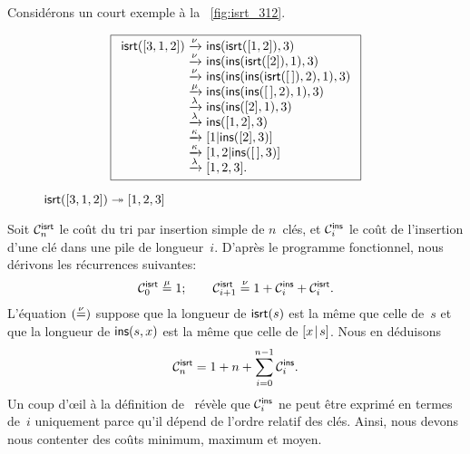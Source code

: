 Considérons un court exemple à la \fig~\vref{fig:isrt_312}.
\begin{figure}
\begin{equation*}
\boxed{%
\begin{array}{r@{\;}l@{\;}l}
\fun{isrt}([3,1,2])
& \xrightarrow{\smash{\nu}} & \fun{ins}(\fun{isrt}([1,2]),3)\\
& \xrightarrow{\smash{\nu}}
& \fun{ins}(\fun{ins}(\fun{isrt}([2]),1),3)\\
& \xrightarrow{\smash{\nu}}
& \fun{ins}(\fun{ins}(\fun{ins}(\fun{isrt}(\el),2),1),3)\\
& \xrightarrow{\smash{\mu}}
& \fun{ins}(\fun{ins}(\fun{ins}(\el,2),1),3)\\
& \xrightarrow{\smash{\lambda}}
& \fun{ins}(\fun{ins}([2],1),3)\\
& \xrightarrow{\smash{\lambda}}
& \fun{ins}([1,2],3)\\
& \xrightarrow{\smash{\kappa}}
& [1|\fun{ins}([2],3)]\\
& \xrightarrow{\smash{\kappa}}
& [1,2|\fun{ins}(\el,3)]\\
& \xrightarrow{\smash{\lambda}}
& [1,2,3].
\end{array}}
\end{equation*}
\caption{\(\fun{isrt}([3,1,2]) \twoheadrightarrow [1,2,3]\)}
\label{fig:isrt_312}
\end{figure}
 

Soit \(\C{\fun{isrt}}{n}\) le coût
du tri par insertion simple de \(n\)~clés, et \(\C{\fun{ins}}{i}\) le
coût de l'insertion d'une clé dans une pile de longueur~\(i\). D'après
le programme fonctionnel, nous dérivons les récurrences suivantes:
\begin{equation*}
\C{\fun{isrt}}{0}   \eqn{\smash{\mu}} 1;\qquad
\C{\fun{isrt}}{i+1} \eqn{\smash{\nu}} 1 + \C{\fun{ins}}{i} +
  \C{\fun{isrt}}{i}.
\end{equation*}
L'équation \((\eqn{\smash{\nu}})\) suppose que la longueur de
\(\fun{isrt}(s)\) est la même que celle de~\(s\) et que la longueur de
\(\fun{ins}(s,x)\) est la même que celle de \(\cons{x}{s}\). Nous en
déduisons
\begin{equation}
\C{\fun{isrt}}{n} = 1 + n + \sum_{i=0}^{n-1}\C{\fun{ins}}{i}.
\label{eq:cost_isrt}
\end{equation}
Un coup d'{\oe}il à la définition de~ révèle que
\(\C{\fun{ins}}{i}\) ne peut être exprimé en termes de~\(i\)
uniquement parce qu'il dépend de l'ordre relatif des clés. Ainsi, nous
devons nous contenter des coûts minimum, maximum et
moyen.

